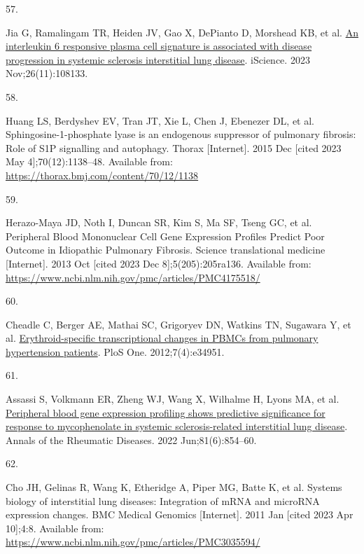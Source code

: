 \documentclass[
]{article}
\newlength{\cslhangindent}
\newlength{\csllabelwidth}
\newlength{\cslentryspacingunit} %
\newenvironment{CSLReferences}[2] %
 {%
  \setlength{\parindent}{0pt}
  \ifodd #1
  \let\oldpar\par
  \def\par{\hangindent=\cslhangindent\oldpar}
  \fi
  \setlength{\parskip}{#2\cslentryspacingunit}
 }%
 {}
\newcommand{\CSLLeftMargin}[1]{\parbox[t]{\csllabelwidth}{#1}}
\newcommand{\CSLRightInline}[1]{\parbox[t]{\linewidth - \csllabelwidth}{#1}\break}
\begin{document}
\begin{CSLReferences}{0}{0}
\leavevmode{}%
\CSLLeftMargin{57. }%
\CSLRightInline{Jia G, Ramalingam TR, Heiden JV, Gao X, DePianto D, Morshead KB, et al. \href{https://doi.org/10.1016/j.isci.2023.108133}{An interleukin 6 responsive plasma cell signature is associated with disease progression in systemic sclerosis interstitial lung disease}. iScience. 2023 Nov;26(11):108133. }

\leavevmode{}%
\CSLLeftMargin{58. }%
\CSLRightInline{Huang LS, Berdyshev EV, Tran JT, Xie L, Chen J, Ebenezer DL, et al. Sphingosine-1-phosphate lyase is an endogenous suppressor of pulmonary fibrosis: Role of {S1P} signalling and autophagy. Thorax {[}Internet{]}. 2015 Dec {[}cited 2023 May 4{]};70(12):1138--48. Available from: \url{https://thorax.bmj.com/content/70/12/1138}}

\leavevmode{}%
\CSLLeftMargin{59. }%
\CSLRightInline{Herazo-Maya JD, Noth I, Duncan SR, Kim S, Ma SF, Tseng GC, et al. Peripheral {Blood} {Mononuclear} {Cell} {Gene} {Expression} {Profiles} {Predict} {Poor} {Outcome} in {Idiopathic} {Pulmonary} {Fibrosis}. Science translational medicine {[}Internet{]}. 2013 Oct {[}cited 2023 Dec 8{]};5(205):205ra136. Available from: \url{https://www.ncbi.nlm.nih.gov/pmc/articles/PMC4175518/}}

\leavevmode{}%
\CSLLeftMargin{60. }%
\CSLRightInline{Cheadle C, Berger AE, Mathai SC, Grigoryev DN, Watkins TN, Sugawara Y, et al. \href{https://doi.org/10.1371/journal.pone.0034951}{Erythroid-specific transcriptional changes in {PBMCs} from pulmonary hypertension patients}. PloS One. 2012;7(4):e34951. }

\leavevmode{}%
\CSLLeftMargin{61. }%
\CSLRightInline{Assassi S, Volkmann ER, Zheng WJ, Wang X, Wilhalme H, Lyons MA, et al. \href{https://doi.org/10.1136/annrheumdis-2021-221313}{Peripheral blood gene expression profiling shows predictive significance for response to mycophenolate in systemic sclerosis-related interstitial lung disease}. Annals of the Rheumatic Diseases. 2022 Jun;81(6):854--60. }

\leavevmode{}%
\CSLLeftMargin{62. }%
\CSLRightInline{Cho JH, Gelinas R, Wang K, Etheridge A, Piper MG, Batte K, et al. Systems biology of interstitial lung diseases: Integration of {mRNA} and {microRNA} expression changes. BMC Medical Genomics {[}Internet{]}. 2011 Jan {[}cited 2023 Apr 10{]};4:8. Available from: \url{https://www.ncbi.nlm.nih.gov/pmc/articles/PMC3035594/}}


\end{CSLReferences}
\end{document}
